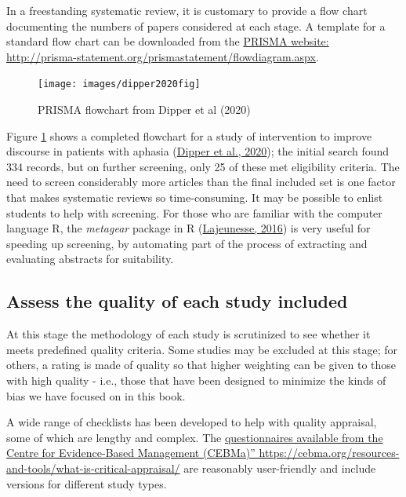 \documentclass{krantz}
\begin{document}
In a freestanding systematic review, it is customary to provide a flow chart documenting the numbers of papers considered at each stage. A template for a standard flow chart can be downloaded from the \href{http://prisma-statement.org/prismastatement/flowdiagram.aspx}{PRISMA website: http://prisma-statement.org/prismastatement/flowdiagram.aspx}. 

\begin{figure}

{\centering \texttt{[image: images/dipper2020fig]} 

}

\caption{PRISMA flowchart from Dipper et al (2020)}\label{fig:prismachart}
\end{figure}

Figure \ref{fig:prismachart} shows a completed flowchart for a study of intervention to improve discourse in patients with aphasia (\protect\hyperlink{ref-dipper2020}{Dipper et al., 2020}); the initial search found 334 records, but on further screening, only 25 of these met eligibility criteria. The need to screen considerably more articles than the final included set is one factor that makes systematic reviews so time-consuming. It may be possible to enlist students to help with screening. For those who are familiar with the computer language R, the \emph{metagear} package in R (\protect\hyperlink{ref-lajeunesse2016}{Lajeunesse, 2016}) is very useful for speeding up screening, by automating part of the process of extracting and evaluating abstracts for suitability.

\hypertarget{assess-the-quality-of-each-study-included}{%
\subsection{Assess the quality of each study included}\label{assess-the-quality-of-each-study-included}}

At this stage the methodology of each study is scrutinized to see whether it meets predefined quality criteria. Some studies may be excluded at this stage; for others, a rating is made of quality so that higher weighting can be given to those with high quality - i.e., those that have been designed to minimize the kinds of bias we have focused on in this book.

A wide range of checklists has been developed to help with quality appraisal, some of which are lengthy and complex. The \href{https://cebma.org/resources-and-tools/what-is-critical-appraisal/}{questionnaires available from the Centre for Evidence-Based Management (CEBMa)'' https://cebma.org/resources-and-tools/what-is-critical-appraisal/} are reasonably user-friendly and include versions for different study types.
\end{document}
